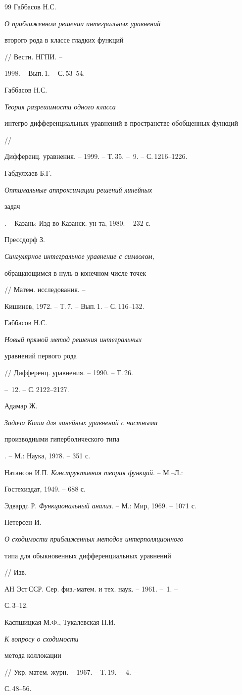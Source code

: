 \begin{thebibliography}{99}
Габбасов Н.С. {\em О приближенном решении интегральных уравнений 


второго рода в классе гладких функций} // Вестн. НГПИ. -- 


1998. -- Вып.\,1. -- С.\,53--54. 




Габбасов Н.С. {\em Теория разрешимости одного класса 


интегро-дифференциальных уравнений в пространстве обобщенных функций} // 


Дифференц. уравнения. -- 1999. -- Т.\,35. -- \No\,9. -- С.\,1216--1226. 




Габдулхаев Б.Г. {\em Оптимальные аппроксимации решений линейных 


задач}. -- Казань: Изд-во Казанск. ун-та, 1980. -- 232 с. 




Прессдорф З. {\em Сингулярное интегральное уравнение с символом, 


обращающимся в нуль в конечном числе точек} // Матем. исследования. -- 


Кишинев, 1972. -- Т.\,7. -- Вып.\,1. -- С.\,116--132. 




Габбасов Н.С. {\em Новый прямой метод решения интегральных 


уравнений первого рода} // Дифференц. уравнения. -- 1990. -- Т.\,26. 


-- \No\,12. -- С.\,2122--2127. 




Адамар Ж. {\em Задача Коши для линейных уравнений с частными 


производными гиперболического типа}. -- М.: Наука, 1978. -- 351 с. 




Натансон И.П. {\em Конструктивная теория функций}. -- М.--Л.: 


Гостехиздат, 1949. -- 688 с. 




Эдвардc Р. {\em Функциональный анализ}. -- М.: Мир, 1969. -- 1071 с. 




Петерсен И. {\em О сходимости приближенных методов интерполяционного 


типа для обыкновенных дифференциальных уравнений} // Изв. 


АН Эст\,ССР. Сер. физ.-матем. и тех. наук. -- 1961. -- \No\,1. -- 


С.\,3--12. 




Каспшицкая М.Ф., Тукалевская Н.И. {\em К вопросу о сходимости 


метода коллокации} // Укр. матем. журн. -- 1967. -- Т.\,19. -- \No\,4. -- 


С.\,48--56. 


 


\end{thebibliography} 


